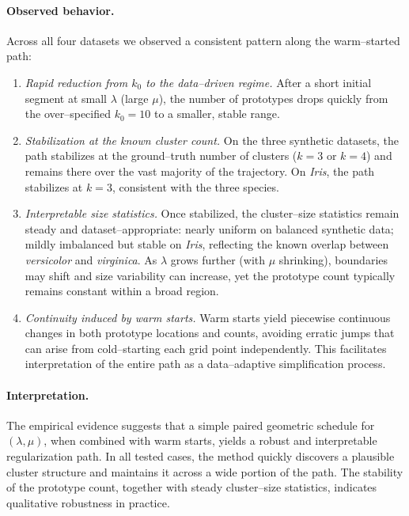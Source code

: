 \documentclass[11pt]{article}
\theoremstyle{definition}
\newcommand{\1}{\mathbf{1}}
\begin{document}
\paragraph{Observed behavior.}
Across all four datasets we observed a consistent pattern along the warm--started
path:
\begin{enumerate}
    \item {\em Rapid reduction from $k_0$ to the data--driven regime.}
    After a short initial segment at small $\lambda$ (large $\mu$), the number
    of prototypes drops quickly from the over--specified $k_0{=}10$ to a
    smaller, stable range.

    \item {\em Stabilization at the known cluster count.}
    On the three synthetic datasets, the path stabilizes at the ground--truth
    number of clusters ($k{=}3$ or $k{=}4$) and remains there over the vast
    majority of the trajectory. On \emph{Iris}, the path stabilizes at
    $k{=}3$, consistent with the three species.

    \item {\em Interpretable size statistics.}
    Once stabilized, the cluster--size statistics remain steady and
    dataset--appropriate: nearly uniform on balanced synthetic data; mildly
    imbalanced but stable on \emph{Iris}, reflecting the known overlap between
    \emph{versicolor} and \emph{virginica}. As $\lambda$ grows further (with
    $\mu$ shrinking), boundaries may shift and size variability can increase,
    yet the prototype count typically remains constant within a broad region.

    \item {\em Continuity induced by warm starts.}
    Warm starts yield piecewise continuous changes in both prototype locations
    and counts, avoiding erratic jumps that can arise from cold--starting each
    grid point independently. This facilitates interpretation of the entire
    path as a data--adaptive simplification process.
\end{enumerate}

\paragraph{Interpretation.}
The empirical evidence suggests that a simple paired geometric schedule for
$(\lambda,\mu)$, when combined with warm starts, yields a robust and
interpretable regularization path. In all tested cases, the method quickly
discovers a plausible cluster structure and maintains it across a wide portion
of the path. The stability of the prototype count, together with steady
cluster--size statistics, indicates qualitative robustness in practice.
\end{document}
